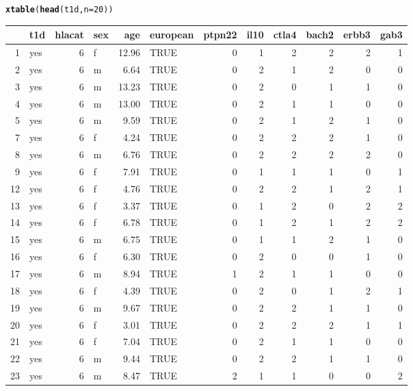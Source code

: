\documentclass[a4paper]{article}\usepackage[]{graphicx}\usepackage[]{color}
\makeatletter
\newcommand{\hlnum}[1]{\textcolor[rgb]{0.686,0.059,0.569}{#1}}%
\newcommand{\hlstd}[1]{\textcolor[rgb]{0.345,0.345,0.345}{#1}}%
\newcommand{\hlkwc}[1]{\textcolor[rgb]{0.333,0.667,0.333}{#1}}%
\newcommand{\hlkwd}[1]{\textcolor[rgb]{0.737,0.353,0.396}{\textbf{#1}}}%
\newenvironment{kframe}{%
 \def\at@end@of@kframe{}%
 \ifinner\ifhmode%
  \def\at@end@of@kframe{\end{minipage}}%
  \begin{minipage}{\columnwidth}%
 \fi\fi%
 \def\FrameCommand##1{\hskip\@totalleftmargin \hskip-\fboxsep
 \colorbox{shadecolor}{##1}\hskip-\fboxsep
     \hskip-\linewidth \hskip-\@totalleftmargin \hskip\columnwidth}%
 \MakeFramed {\advance\hsize-\width
   \@totalleftmargin\z@ \linewidth\hsize
   \@setminipage}}%
 {\par\unskip\endMakeFramed%
 \at@end@of@kframe}
\makeatother
\begin{document}
\begin{kframe}
\begin{alltt}
\hlkwd{xtable}\hlstd{(}\hlkwd{head}\hlstd{(t1d,} \hlkwc{n}\hlstd{=}\hlnum{20}\hlstd{))}
\end{alltt}
\end{kframe}%
\begin{table}[ht]
\centering
\begin{tabular}{rlrlrlrrrrrr}
  \hline
 & t1d & hlacat & sex & age & european & ptpn22 & il10 & ctla4 & bach2 & erbb3 & gab3 \\ 
  \hline
1 & yes &   6 & f & 12.96 & TRUE &   0 &   1 &   2 &   2 &   2 &   1 \\ 
  2 & yes &   6 & m & 6.64 & TRUE &   0 &   2 &   1 &   2 &   0 &   0 \\ 
  3 & yes &   6 & m & 13.23 & TRUE &   0 &   2 &   0 &   1 &   1 &   0 \\ 
  4 & yes &   6 & m & 13.00 & TRUE &   0 &   2 &   1 &   1 &   0 &   0 \\ 
  5 & yes &   6 & m & 9.59 & TRUE &   0 &   2 &   1 &   2 &   1 &   0 \\ 
  7 & yes &   6 & f & 4.24 & TRUE &   0 &   2 &   2 &   2 &   1 &   0 \\ 
  8 & yes &   6 & m & 6.76 & TRUE &   0 &   2 &   2 &   2 &   2 &   0 \\ 
  9 & yes &   6 & f & 7.91 & TRUE &   0 &   1 &   1 &   1 &   0 &   1 \\ 
  12 & yes &   6 & f & 4.76 & TRUE &   0 &   2 &   2 &   1 &   2 &   1 \\ 
  13 & yes &   6 & f & 3.37 & TRUE &   0 &   1 &   2 &   0 &   2 &   2 \\ 
  14 & yes &   6 & f & 6.78 & TRUE &   0 &   1 &   2 &   1 &   2 &   2 \\ 
  15 & yes &   6 & m & 6.75 & TRUE &   0 &   1 &   1 &   2 &   1 &   0 \\ 
  16 & yes &   6 & f & 6.30 & TRUE &   0 &   2 &   0 &   0 &   1 &   0 \\ 
  17 & yes &   6 & m & 8.94 & TRUE &   1 &   2 &   1 &   1 &   0 &   0 \\ 
  18 & yes &   6 & f & 4.39 & TRUE &   0 &   2 &   0 &   1 &   2 &   1 \\ 
  19 & yes &   6 & m & 9.67 & TRUE &   0 &   2 &   2 &   1 &   1 &   0 \\ 
  20 & yes &   6 & f & 3.01 & TRUE &   0 &   2 &   2 &   2 &   1 &   1 \\ 
  21 & yes &   6 & f & 7.04 & TRUE &   0 &   2 &   1 &   1 &   0 &   0 \\ 
  22 & yes &   6 & m & 9.44 & TRUE &   0 &   2 &   2 &   1 &   1 &   0 \\ 
  23 & yes &   6 & m & 8.47 & TRUE &   2 &   1 &   1 &   0 &   0 &   2 \\ 
   \hline
\end{tabular}
\end{table}
\end{document}
